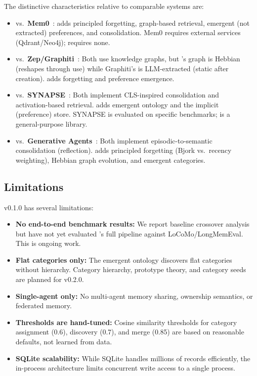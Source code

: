 The distinctive characteristics relative to comparable systems are:
\begin{itemize}[nosep]
    \item vs.\ \textbf{Mem0}~\cite{choudhary2025mem0}: \alaya{} adds
    principled forgetting, graph-based retrieval, emergent (not extracted)
    preferences, and consolidation. Mem0 requires external services
    (Qdrant/Neo4j); \alaya{} requires none.
    \item vs.\ \textbf{Zep/Graphiti}~\cite{dempsey2025graphiti}: Both use
    knowledge graphs, but \alaya{}'s graph is Hebbian (reshapes through use)
    while Graphiti's is LLM-extracted (static after creation). \alaya{} adds
    forgetting and preference emergence.
    \item vs.\ \textbf{SYNAPSE}~\cite{jiang2026synapse}: Both implement
    CLS-inspired consolidation and activation-based retrieval. \alaya{} adds
    emergent ontology and the implicit (preference) store. SYNAPSE is
    evaluated on specific benchmarks; \alaya{} is a general-purpose library.
    \item vs.\ \textbf{Generative Agents}~\cite{park2023generative}: Both
    implement episodic-to-semantic consolidation (reflection). \alaya{} adds
    principled forgetting (Bjork vs.\ recency weighting), Hebbian graph
    evolution, and emergent categories.
\end{itemize}

\subsection{Limitations}

\alaya{} v0.1.0 has several limitations:
\begin{itemize}[nosep]
    \item \textbf{No end-to-end benchmark results:} We report baseline
    crossover analysis but have not yet evaluated \alaya{}'s full pipeline
    against LoCoMo/LongMemEval. This is ongoing work.
    \item \textbf{Flat categories only:} The emergent ontology discovers
    flat categories without hierarchy. Category hierarchy, prototype theory,
    and category seeds are planned for v0.2.0.
    \item \textbf{Single-agent only:} No multi-agent memory sharing,
    ownership semantics, or federated memory.
    \item \textbf{Thresholds are hand-tuned:} Cosine similarity thresholds
    for category assignment (0.6), discovery (0.7), and merge (0.85) are
    based on reasonable defaults, not learned from data.
    \item \textbf{SQLite scalability:} While SQLite handles millions of
    records efficiently, the in-process architecture limits concurrent write
    access to a single process.
\end{itemize}
